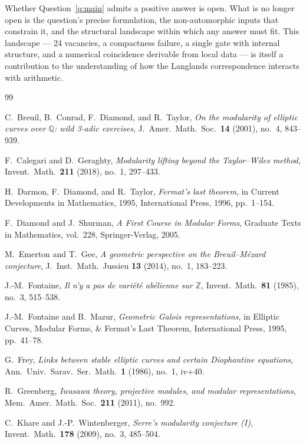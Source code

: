 \documentclass[12pt]{amsart}
\theoremstyle{definition}
\theoremstyle{remark}
\begin{document}
Whether Question~\ref{q:main} admits a positive answer is open. What is no longer open is the question's precise formulation, the non-automorphic inputs that constrain it, and the structural landscape within which any answer must fit. This landscape --- 24 vacancies, a compactness failure, a single gate with internal structure, and a numerical coincidence derivable from local data --- is itself a contribution to the understanding of how the Langlands correspondence interacts with arithmetic.

\bigskip

\begin{thebibliography}{99}

 C.~Breuil, B.~Conrad, F.~Diamond, and R.~Taylor, \emph{On the modularity of elliptic curves over $\mathbb{Q}$: wild 3-adic exercises}, J.\ Amer.\ Math.\ Soc.\ \textbf{14} (2001), no.~4, 843--939.

 F.~Calegari and D.~Geraghty, \emph{Modularity lifting beyond the Taylor--Wiles method}, Invent.\ Math.\ \textbf{211} (2018), no.~1, 297--433.

 H.~Darmon, F.~Diamond, and R.~Taylor, \emph{Fermat's last theorem}, in Current Developments in Mathematics, 1995, International Press, 1996, pp.~1--154.

 F.~Diamond and J.~Shurman, \emph{A First Course in Modular Forms}, Graduate Texts in Mathematics, vol.~228, Springer-Verlag, 2005.

 M.~Emerton and T.~Gee, \emph{A geometric perspective on the Breuil--M\'ezard conjecture}, J.\ Inst.\ Math.\ Jussieu \textbf{13} (2014), no.~1, 183--223.

 J.-M.~Fontaine, \emph{Il n'y a pas de vari\'et\'e ab\'elienne sur $\mathbb{Z}$}, Invent.\ Math.\ \textbf{81} (1985), no.~3, 515--538.

 J.-M.~Fontaine and B.~Mazur, \emph{Geometric Galois representations}, in Elliptic Curves, Modular Forms, \& Fermat's Last Theorem, International Press, 1995, pp.~41--78.

 G.~Frey, \emph{Links between stable elliptic curves and certain Diophantine equations}, Ann.\ Univ.\ Sarav.\ Ser.\ Math.\ \textbf{1} (1986), no.~1, iv+40.

 R.~Greenberg, \emph{Iwasawa theory, projective modules, and modular representations}, Mem.\ Amer.\ Math.\ Soc.\ \textbf{211} (2011), no.~992.

 C.~Khare and J.-P.~Wintenberger, \emph{Serre's modularity conjecture (I)}, Invent.\ Math.\ \textbf{178} (2009), no.~3, 485--504.


\end{thebibliography}
\end{document}
